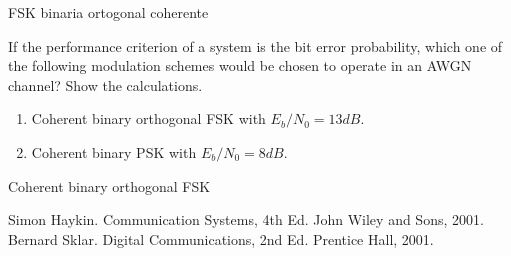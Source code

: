 \documentclass[es,boletin]{uah}
\begin{document}
{

FSK binaria ortogonal coherente
}
{

	\cite{Sklar} If the performance criterion of a system is the bit error probability, which one of the following modulation schemes would be chosen to operate in an AWGN channel? Show the calculations.

\begin{enumerate}
	\item Coherent binary orthogonal FSK with $E_b/N_0 = 13 dB$.
	\item Coherent binary PSK with $E_b/N_0 = 8 dB$.
\end{enumerate}

}
{

Coherent binary orthogonal FSK
}



\begin{thebibliography}{100}
	  Simon Haykin. Communication Systems, 4th Ed. John Wiley and Sons, 2001.
	 Bernard Sklar. Digital Communications, 2nd Ed. Prentice Hall, 2001.
	\end{thebibliography}
\end{document}
